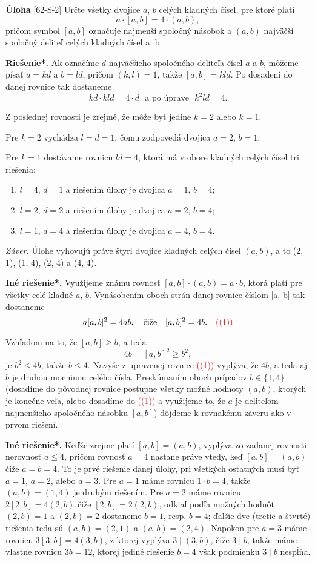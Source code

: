\documentclass{article}
\newcommand{\rieh}{\textbf{Riešenie*.} }
\newcommand\todo[1]{\noindent\textcolor{red}{(#1)}}
\newcommand{\problem}[4]{
  \begin{tcolorbox}[breakable,notitle,boxrule=0pt,colback=light-gray,colframe=light-gray]
    \textbf{Úloha}
    [#1] #3
  \end{tcolorbox}
  \noindent#4
}
\begin{document}
\problem{62-S-2}{}{
Určte všetky dvojice $a$, $b$ celých kladných čísel, pre ktoré platí
$$a \cdot [a, b] = 4 \cdot (a, b),$$
pričom symbol $[a, b]$ označuje najmenší spoločný násobok a $(a, b)$ najväčší spoločný deliteľ celých kladných čísel a, b.
}{
\rieh Ak označíme $d$ najväčšieho spoločného deliteľa čísel $a$ a $b$, môžeme písať $a = kd$ a $b = ld$, pričom $(k, l) = 1$, takže $[a, b] = kld$. Po dosadení do danej rovnice tak dostaneme
$$kd \cdot kld = 4 \cdot d \ \ \ \text{a po úprave} \ \ \ k^2ld = 4.$$

Z poslednej rovnosti je zrejmé, že môže byť jedine $k = 2$ alebo $k = 1$.

Pre $k = 2$ vychádza $l = d = 1$, čomu zodpovedá dvojica $a = 2$, $b = 1$.

Pre $k = 1$ dostávame rovnicu $ld = 4$, ktorá má v obore kladných celých čísel tri riešenia:
\begin{enumerate}
    \item $l = 4$, $d = 1$ a riešením úlohy je dvojica $a = 1$, $b = 4$;
    \item $l = 2$, $d = 2$ a riešením úlohy je dvojica $a = 2$, $b = 4$;
    \item $l = 1$, $d = 4$ a riešením úlohy je dvojica $a = 4$, $b = 4$.
\end{enumerate}
\textit{Záver.} Úlohe vyhovujú práve štyri dvojice kladných celých čísel $(a, b)$, a to (2, 1), (1, 4),
(2, 4) a (4, 4).

\textbf{Iné riešenie*.} Využijeme známu rovnosť $[a, b] \cdot (a, b) = a \cdot b$, ktorá platí pre všetky celé kladné $a$, $b$. Vynásobením oboch strán danej rovnice číslom [a, b] tak dostaneme
$$a[a, b]^2= 4ab, \ \ \ \text{čiže} \ \ \ [a, b]^2= 4b. \ \ \ \todo{ (1)}$$

Vzhľadom na to, že $[a, b] \geq b$, a teda
$$4b = [a, b]^2 \geq b^2,$$
je $b^2\leq  4b$, takže $b \leq 4$. Navyše z upravenej rovnice \todo{(1)} vyplýva, že $4b$, a teda aj $b$ je druhou mocninou celého čísla. Preskúmaním oboch prípadov $b \in \{1, 4\}$ (dosadíme do pôvodnej rovnice postupne všetky možné hodnoty $(a, b)$, ktorých je konečne veľa, alebo dosadíme do \todo{(1)} a využijeme to, že $a$ je deliteľom najmenšieho spoločného násobku $[a, b]$) dôjdeme k rovnakému záveru ako v prvom riešení.

\textbf{Iné riešenie*.} Keďže zrejme platí $[a, b] = (a, b)$, vyplýva zo zadanej rovnosti nerovnosť $a \leq 4$, pričom rovnosť $a = 4$ nastane práve vtedy, keď $[a, b] = (a, b)$ čiže $a = b = 4$. To je prvé riešenie danej úlohy, pri všetkých ostatných musí byť $a = 1$, $a = 2$, alebo $a = 3$. Pre $a = 1$ máme rovnicu $1 \cdot b = 4$, takže $(a, b) = (1, 4)$ je druhým riešením. Pre $a = 2$ máme rovnicu $2[2, b] = 4(2, b)$ čiže $[2, b] = 2(2, b)$, odkiaľ podľa možných hodnôt $(2, b) = 1$ a $(2, b) = 2$ dostaneme $b = 1$, resp. $b = 4$; ďalšie dve (tretie a štvrté) riešenia teda sú $(a, b) = (2, 1)$ a $(a, b) = (2, 4)$. Napokon pre $a = 3$ máme rovnicu $3[3, b] = 4(3, b)$, z ktorej vyplýva $3 \mid (3, b)$, čiže $3 \mid b$, takže máme vlastne rovnicu $3b = 12$, ktorej jediné riešenie $b = 4$ však podmienku $3 \mid b$ nespĺňa.

}
\end{document}
